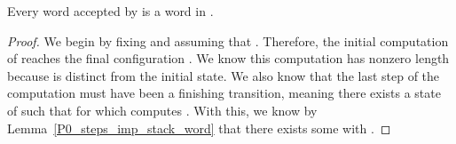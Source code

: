 \begin{isabellebody}
\begin{isamarkuptext}
\begin{theorem}\label{P0_sound}
Every word accepted by  is a word in .
\begin{proof}
We begin by fixing  and assuming that . Therefore, the initial computation 
of  reaches the final configuration . We know this 
computation has nonzero length because  is distinct from the initial state.
We also know that the last step of the computation must have been a finishing transition, meaning
there exists a state  of  such that  for which 
 computes . With this, we know by 
Lemma~\ref{P0_steps_imp_stack_word} that there exists some  with
.


\end{proof}
\end{theorem}
\end{isamarkuptext}
\end{isabellebody}

